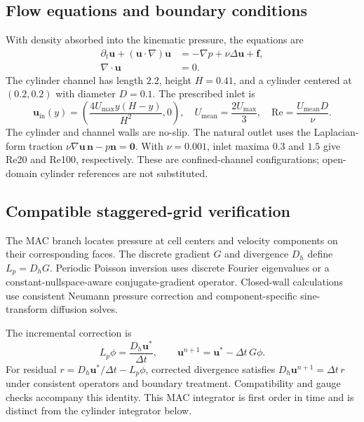 \documentclass[11pt,a4paper]{article}
\begin{document}
\subsection{Flow equations and boundary conditions}
With density absorbed into the kinematic pressure, the equations are
\begin{align}
 \partial_t\bm u+(\bm u\cdot\nabla)\bm u&=-\nabla p+\nu\Delta\bm u+\bm f,\label{eq:ns}\\
 \nabla\cdot\bm u&=0.\label{eq:continuity}
\end{align}
The cylinder channel has length $2.2$, height $H=0.41$, and a cylinder centered at $(0.2,0.2)$ with diameter $D=0.1$. The prescribed inlet is
\begin{equation}
 \bm u_{\mathrm{in}}(y)=\left(\frac{4U_{\max}y(H-y)}{H^2},0\right),\quad
 U_{\mathrm{mean}}=\frac{2U_{\max}}{3},\quad
 \mathrm{Re}=\frac{U_{\mathrm{mean}}D}{\nu}.\label{eq:inlet}
\end{equation}
The cylinder and channel walls are no-slip. The natural outlet uses the Laplacian-form traction $\nu\nabla\bm u\,\bm n-p\bm n=\bm0$. With $\nu=0.001$, inlet maxima $0.3$ and $1.5$ give Re20 and Re100, respectively. These are confined-channel configurations; open-domain cylinder references are not substituted.

\subsection{Compatible staggered-grid verification}
The MAC branch locates pressure at cell centers and velocity components on their corresponding faces. The discrete gradient $G$ and divergence $D_h$ define $L_p=D_hG$. Periodic Poisson inversion uses discrete Fourier eigenvalues or a constant-nullspace-aware conjugate-gradient operator. Closed-wall calculations use consistent Neumann pressure correction and component-specific sine-transform diffusion solves.

The incremental correction is
\begin{equation}
 L_p\phi=\frac{D_h\bm u^*}{\Delta t},\qquad
 \bm u^{n+1}=\bm u^*-\Delta t\,G\phi.\label{eq:projection}
\end{equation}
For residual $r=D_h\bm u^*/\Delta t-L_p\phi$, corrected divergence satisfies $D_h\bm u^{n+1}=\Delta t\,r$ under consistent operators and boundary treatment. Compatibility and gauge checks accompany this identity. This MAC integrator is first order in time and is distinct from the cylinder integrator below.
\end{document}
